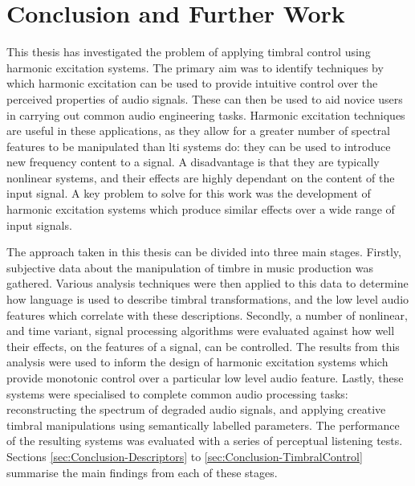 \chapter{Conclusion and Further Work}
\label{chap:Conclusion}

	This thesis has investigated the problem of applying timbral control using harmonic excitation systems. The primary
	aim was to identify techniques by which harmonic excitation can be used to provide intuitive control over the
	perceived properties of audio signals. These can then be used to aid novice users in carrying out common audio
	engineering tasks. Harmonic excitation techniques are useful in these applications, as they allow for a greater
	number of spectral features to be manipulated than \acrshort{lti} systems do: they can be used to introduce new
	frequency content to a signal. A disadvantage is that they are typically nonlinear systems, and their effects are
	highly dependant on the content of the input signal. A key problem to solve for this work was the development of
	harmonic excitation systems which produce similar effects over a wide range of input signals.

	The approach taken in this thesis can be divided into three main stages. Firstly, subjective data about the
	manipulation of timbre in music production was gathered. Various analysis techniques were then applied to this data
	to determine how language is used to describe timbral transformations, and the low level audio features which
	correlate with these descriptions. Secondly, a number of nonlinear, and time variant, signal processing algorithms
	were evaluated against how well their effects, on the features of a signal, can be controlled. The results from this
	analysis were used to inform the design of harmonic excitation systems which provide monotonic control over a
	particular low level audio feature. Lastly, these systems were specialised to complete common audio processing
	tasks: reconstructing the spectrum of degraded audio signals, and applying creative timbral manipulations using
	semantically labelled parameters. The performance of the resulting systems was evaluated with a series of perceptual
	listening tests. Sections \ref{sec:Conclusion-Descriptors} to \ref{sec:Conclusion-TimbralControl} summarise the main
	findings from each of these stages.

